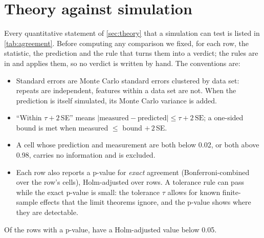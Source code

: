 \section{Theory against simulation}\label{app:agreement}

Every quantitative statement of \cref{sec:theory} that a simulation can test is listed in \cref{tab:agreement}. Before computing any comparison we fixed, for each row, the statistic, the prediction and the rule that turns them into a verdict; the rules are in  and  applies them, so no verdict is written by hand. The conventions are:
\begin{itemize}
  \item Standard errors are Monte Carlo standard errors clustered by data set: repeats are independent, features within a data set are not. When the prediction is itself simulated, its Monte Carlo variance is added.
  \item ``Within $\tau + 2$\,SE'' means $|\text{measured} - \text{predicted}| \le \tau + 2\,\mathrm{SE}$; a one-sided bound is met when measured $\le$ bound $+\, 2$\,SE.
  \item A cell whose prediction and measurement are both below 0.02, or both above 0.98, carries no information and is excluded.
  \item Each row also reports a p-value for \emph{exact} agreement (Bonferroni-combined over the row's cells), Holm-adjusted over rows. A tolerance rule can pass while the exact p-value is small: the tolerance $\tau$ allows for known finite-sample effects that the limit theorems ignore, and the p-value shows where they are detectable.
\end{itemize}
Of the \numHolmTests{} rows with a p-value, \numHolmRejected{} have a Holm-adjusted value below 0.05.

{\small
\setlength{\tabcolsep}{4pt}

}
